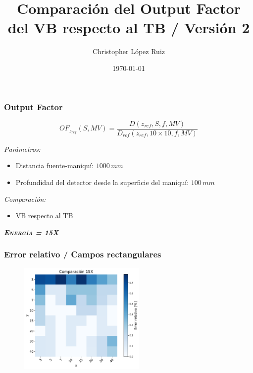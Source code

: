 \documentclass[aspectratio=169,xcolor=dvipsnames,t]{beamer}
\title{Comparación del Output Factor del VB respecto al TB / Versión 2}
\date{\today}
\author{Christopher López Ruiz}
\institute{INCan}
\newcommand{\be}{\begin{equation*}}
\newcommand{\ee}{\end{equation*}}
\begin{document}
\frame[plain,bg=fondo.jpg]{\titlepage}


\begin{frame}
    \frametitle{Output Factor}

    \be
      OF_{z_{ref}}(S,MV) = \frac{D(z_{ref},S,f,MV)}{D_{ref}(z_{ref},10 \times 10,f,MV)}
    \ee

    \vspace{10pt}

    \textit{Parámetros:}

    \begin{itemize}
      \item Distancia fuente-maniquí: $1000 \, mm$
      \item Profundidad del detector desde la superficie del maniquí: $100 \, mm$
    \end{itemize}

    \textit{Comparación:}
    \begin{itemize}
      \item VB respecto al TB
    \end{itemize}


\end{frame}


\begin{frame}[standout]
      \centering\LARGE
      \textbf{\itshape\scshape Energía = 15X}
\end{frame}


\begin{frame}
      \frametitle{Error relativo / Campos rectangulares}

      \begin{figure}
            \centering
            \includegraphics[width=0.55\textwidth]{15X_hm1.pdf}
      \end{figure}

\end{frame}
\end{document}
